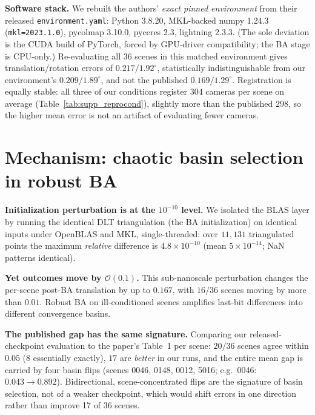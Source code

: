 \documentclass[10pt,twocolumn,letterpaper]{article}
\renewcommand{\deg}{^{\circ}}
\begin{document}
\noindent\textbf{Software stack.} We rebuilt the authors' \emph{exact pinned environment}
from their released \texttt{environment.yaml}: Python 3.8.20, MKL-backed numpy 1.24.3
(\texttt{mkl=2023.1.0}), pycolmap 3.10.0, pyceres 2.3, lightning 2.3.3. (The sole deviation
is the CUDA build of PyTorch, forced by GPU-driver compatibility; the BA stage is
CPU-only.) Re-evaluating all 36 scenes in this matched environment gives
translation/rotation errors of $0.217/1.92\deg$, statistically indistinguishable from
our environment's $0.209/1.89\deg$, and not the published $0.169/1.29\deg$. Registration is
equally stable: all three of our conditions register $304$ cameras per scene
on average (Table~\ref{tab:supp_reprocond}), slightly more than the published $298$,
so the higher mean error is not an artifact of evaluating fewer cameras.

\section{Mechanism: chaotic basin selection in robust BA}\label{sec:mech}
\noindent\textbf{Initialization perturbation is at the $10^{-10}$ level.} We isolated the
BLAS layer by running the identical DLT triangulation (the BA initialization) on identical
inputs under OpenBLAS and MKL, single-threaded: over $11{,}131$ triangulated points the
maximum \emph{relative} difference is $4.8\times 10^{-10}$ (mean $5\times10^{-14}$; NaN
patterns identical).

\noindent\textbf{Yet outcomes move by $\mathcal{O}(0.1)$.} This sub-nanoscale perturbation
changes the per-scene post-BA translation by up to $0.167$, with $16/36$ scenes moving by
more than $0.01$. Robust BA on ill-conditioned scenes amplifies last-bit differences into
different convergence basins.

\noindent\textbf{The published gap has the same signature.} Comparing our released-checkpoint
evaluation to the paper's Table~1 per scene: $20/36$ scenes agree within $0.05$
($8$ essentially exactly), $17$ are \emph{better} in our runs, and the entire mean gap is carried by four
basin flips (scenes 0046, 0148, 0012, 5016; e.g.\ 0046: $0.043 \to 0.892$). Bidirectional,
scene-concentrated flips are the signature of basin selection, not of a weaker checkpoint,
which would shift errors in one direction rather than improve 17 of 36 scenes.
\end{document}
